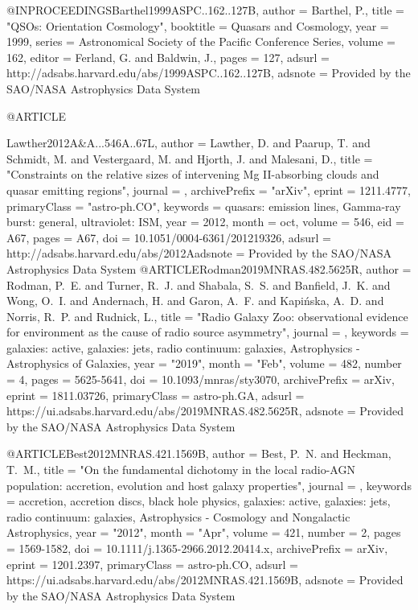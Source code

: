 \documentclass[twocolumn]{aastex62}
\begin{document}
{{{{{{{{{{{{{{@INPROCEEDINGS{Barthel1999ASPC..162..127B,
   author = {{Barthel}, P.},
    title = "{QSOs: Orientation {\amp} Cosmology}",
booktitle = {Quasars and Cosmology},
     year = 1999,
   series = {Astronomical Society of the Pacific Conference Series},
   volume = 162,
   editor = {{Ferland}, G. and {Baldwin}, J.},
    pages = {127},
   adsurl = {http://adsabs.harvard.edu/abs/1999ASPC..162..127B},
  adsnote = {Provided by the SAO/NASA Astrophysics Data System}
}


@ARTICLE{Lawther2012A&A...546A..67L,
   author = {{Lawther}, D. and {Paarup}, T. and {Schmidt}, M. and {Vestergaard}, M. and 
	{Hjorth}, J. and {Malesani}, D.},
    title = "{Constraints on the relative sizes of intervening Mg II-absorbing clouds and quasar emitting regions}",
  journal = {\aap},
archivePrefix = "arXiv",
   eprint = {1211.4777},
 primaryClass = "astro-ph.CO",
 keywords = {quasars: emission lines, Gamma-ray burst: general, ultraviolet: ISM},
     year = 2012,
    month = oct,
   volume = 546,
      eid = {A67},
    pages = {A67},
      doi = {10.1051/0004-6361/201219326},
   adsurl = {http://adsabs.harvard.edu/abs/2012Aadsnote = {Provided by the SAO/NASA Astrophysics Data System}
}
@ARTICLE{Rodman2019MNRAS.482.5625R,
       author = {{Rodman}, P.~E. and {Turner}, R.~J. and {Shabala}, S.~S. and
         {Banfield}, J.~K. and {Wong}, O.~I. and {Andernach}, H. and
         {Garon}, A.~F. and {Kapi{\'n}ska}, A.~D. and {Norris}, R.~P. and
         {Rudnick}, L.},
        title = "{Radio Galaxy Zoo: observational evidence for environment as the cause of radio source asymmetry}",
      journal = {\mnras},
     keywords = {galaxies: active, galaxies: jets, radio continuum: galaxies, Astrophysics - Astrophysics of Galaxies},
         year = "2019",
        month = "Feb",
       volume = {482},
       number = {4},
        pages = {5625-5641},
          doi = {10.1093/mnras/sty3070},
archivePrefix = {arXiv},
       eprint = {1811.03726},
 primaryClass = {astro-ph.GA},
       adsurl = {https://ui.adsabs.harvard.edu/abs/2019MNRAS.482.5625R},
      adsnote = {Provided by the SAO/NASA Astrophysics Data System}
}

@ARTICLE{Best2012MNRAS.421.1569B,
       author = {{Best}, P.~N. and {Heckman}, T.~M.},
        title = "{On the fundamental dichotomy in the local radio-AGN population: accretion, evolution and host galaxy properties}",
      journal = {\mnras},
     keywords = {accretion, accretion discs, black hole physics, galaxies: active, galaxies: jets, radio continuum: galaxies, Astrophysics - Cosmology and Nongalactic Astrophysics},
         year = "2012",
        month = "Apr",
       volume = {421},
       number = {2},
        pages = {1569-1582},
          doi = {10.1111/j.1365-2966.2012.20414.x},
archivePrefix = {arXiv},
       eprint = {1201.2397},
 primaryClass = {astro-ph.CO},
       adsurl = {https://ui.adsabs.harvard.edu/abs/2012MNRAS.421.1569B},
      adsnote = {Provided by the SAO/NASA Astrophysics Data System}
}



}}}}}}}}}}}}}}}
\end{document}
